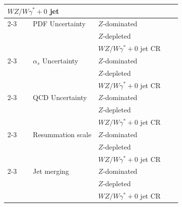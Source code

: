 \begin{table}[ht!]
{\begin{tabular}{llrl}
    $WZ/W\gamma^{*}+0$ jet & & & \\
    \cline{2-3}
    \cline{2-3}
    ~~~~PDF Uncertainty                                                                                & $Z$-dominated   \\
                                                                                                       & $Z$-depleted    \\
                                                                                                       & $WZ/W\gamma^{*}+0$ jet CR  \\
    \cline{2-3}                                                                                               
    ~~~~$\alpha_{s}$ Uncertainty                                                                       & $Z$-dominated   \\
                                                                                                       & $Z$-depleted   \\
                                                                                                       & $WZ/W\gamma^{*}+0$ jet CR  \\
    \cline{2-3}                                                                                               
    ~~~~QCD Uncertainty                                                                                & $Z$-dominated  \\
                                                                                                       & $Z$-depleted   \\
                                                                                                       & $WZ/W\gamma^{*}+0$ jet CR  \\
    \cline{2-3}
    ~~~~Resummation scale                                                                              & $Z$-dominated   \\
                                                                                                       & $Z$-depleted   \\
                                                                                                       & $WZ/W\gamma^{*}+0$ jet CR  \\
    \cline{2-3}
    ~~~~Jet merging                                                                                    & $Z$-dominated  \\
                                                                                                       & $Z$-depleted   \\
                                                                                                       & $WZ/W\gamma^{*}+0$ jet CR \\
                                                                                                       

\end{tabular}}
\end{table}
